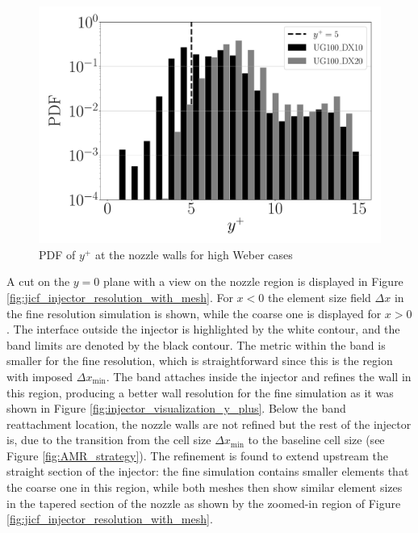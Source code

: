 \begin{figure}[ht]
	\centering
   \includegraphics[scale=0.20]{./part2_developments/figures_ch5_resolved_JICF/instabilities_resolution/y_plus_injector}
   \vspace{-0.15in}
   \caption{PDF of $y^+$ at the nozzle walls for high Weber cases}
   \label{fig:jicf_nozzle_y_plus_PDF}
\end{figure}




A cut on the $y = 0$ plane with a view on the nozzle region is displayed in Figure \ref{fig:jicf_injector_resolution_with_mesh}.  For $x < 0$ the element size field $\Delta x$ in the fine resolution simulation is shown, while the coarse one is displayed for $x > 0$. The interface outside the injector is highlighted by the white contour, and the band limits are denoted by the black contour. The metric within the band is smaller for the fine resolution, which is straightforward since this is the region with imposed $\Delta x_\mathrm{min}$. The band attaches inside the injector and refines the wall in this region, producing a better wall resolution for the fine simulation as it was shown in Figure \ref{fig:injector_visualization_y_plus}. Below the band reattachment location, the nozzle walls are not refined but the rest of the injector is, due to the transition from the cell size $\Delta x_\mathrm{min}$ to the baseline cell size (see Figure \ref{fig:AMR_strategy}). The refinement is found to extend upstream the straight section of the injector: the fine simulation contains smaller elements that the coarse one in this region, while both meshes then show similar element sizes in the tapered section of the nozzle as shown by the zoomed-in region of Figure \ref{fig:jicf_injector_resolution_with_mesh}.




